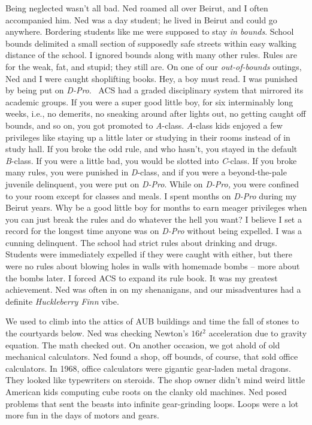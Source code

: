 Being neglected wasn't all bad. Ned roamed all over Beirut, and I often
accompanied him. Ned was a day student; he lived in Beirut and could go
anywhere. Bordering students like me were supposed to stay \emph{in
bounds}. School bounds delimited a small section of supposedly safe
streets within easy walking distance of the school. I ignored bounds
along with many other rules. Rules are for the weak, fat, and stupid;
they still are. On one of our \emph{out-of-bounds} outings, Ned and I
were caught shoplifting books. Hey, a boy must read. I was punished by
being put on \emph{D-Pro}.~ ACS had a graded disciplinary system that
mirrored its academic groups. If you were a super good little boy, for
six interminably long weeks, i.e., no demerits, no sneaking around after
lights out, no getting caught off bounds, and so on, you got promoted to
\emph{A}-class. \emph{A}-class kids enjoyed a few privileges like
staying up a little later or studying in their rooms instead of in study
hall. If you broke the odd rule, and who hasn't, you stayed in the
default \emph{B}-class. If you were a little bad, you would be slotted
into \emph{C}-class. If you broke many rules, you were punished in
\emph{D}-class, and if you were a beyond-the-pale juvenile delinquent,
you were put on \emph{D-Pro}. While on \emph{D-Pro,} you were confined
to your room except for classes and meals. I spent months on
\emph{D-Pro} during my Beirut years. Why be a good little boy for months
to earn meager privileges when you can just break the rules and do
whatever the hell you want? I believe I set a record for the longest
time anyone was on \emph{D-Pro} without being expelled. I was a cunning
delinquent. The school had strict rules about drinking and drugs.
Students were immediately expelled if they were caught with either, but
there were no rules about blowing holes in walls with homemade bombs --
more about the bombs later. I forced ACS to expand its rule book. It was
my greatest achievement. Ned was often in on my shenanigans, and our
misadventures had a definite \emph{Huckleberry Finn} vibe.

We used to climb into the attics of AUB buildings and time the fall of
stones to the courtyards below. Ned was checking Newton's \(16t^{2}\)
acceleration due to gravity equation. The math checked out. On another
occasion, we got ahold of old mechanical calculators. Ned found a shop,
off bounds, of course, that sold office calculators. In 1968, office
calculators were gigantic gear-laden metal dragons. They looked like
typewriters on steroids. The shop owner didn't mind weird little
American kids computing cube roots on the clanky old machines. Ned posed
problems that sent the beasts into infinite gear-grinding loops. Loops
were a lot more fun in the days of motors and gears.

